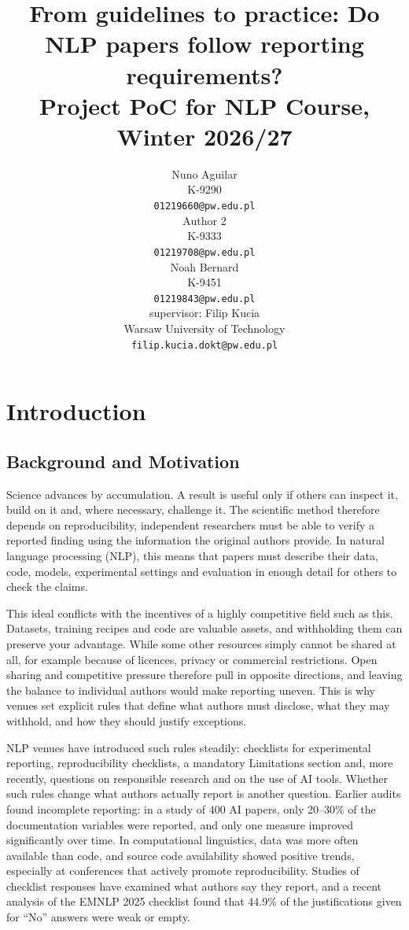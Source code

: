 \documentclass[11pt]{article}
\title{From guidelines to practice: Do NLP papers follow reporting requirements?\\Project PoC for NLP Course, Winter 2026/27}
\author{Nuno Aguilar \\
  K-9290 \\
  {\tt 01219660@pw.edu.pl} \\\And
  Author 2 \\
  K-9333 \\
  {\tt 01219708@pw.edu.pl} \\ \And
  Noah Bernard \\
  K-9451 \\
  {\tt 01219843@pw.edu.pl} \\ \AND
  supervisor:  Filip Kucia\\
  Warsaw University of Technology \\
  {\tt filip.kucia.dokt@pw.edu.pl}}
\date{}
\begin{document}
\maketitle

\section{Introduction}

\subsection{Background and Motivation}

Science advances by accumulation. A result is useful only if others can inspect it, build on it and, where necessary, challenge it. The scientific method therefore depends on reproducibility, independent researchers must be able to verify a reported finding using the information the original authors provide. In natural language processing (NLP), this means that papers must describe their data, code, models, experimental settings and evaluation in enough detail for others to check the claims.

This ideal conflicts with the incentives of a highly competitive field such as this. Datasets, training recipes and code are valuable assets, and withholding them can preserve your advantage. While some other resources simply cannot be shared at all, for example because of licences, privacy or commercial restrictions. Open sharing and competitive pressure therefore pull in opposite directions, and leaving the balance to individual authors would make reporting uneven. This is why venues set explicit rules that define what authors must disclose, what they may withhold, and how they should justify exceptions.

NLP venues have introduced such rules steadily: checklists for experimental reporting, reproducibility checklists, a mandatory Limitations section and, more recently, questions on responsible research and on the use of AI tools. Whether such rules change what authors actually report is another question. Earlier audits found incomplete reporting: in a study of 400 AI papers, only 20--30\% of the documentation variables were reported, and only one measure improved significantly over time. In computational linguistics, data was more often available than code, and source code availability showed positive trends, especially at conferences that actively promote reproducibility. Studies of checklist responses have examined what authors say they report, and a recent analysis of the EMNLP 2025 checklist found that 44.9\% of the justifications given for ``No'' answers were weak or empty.
\end{document}
